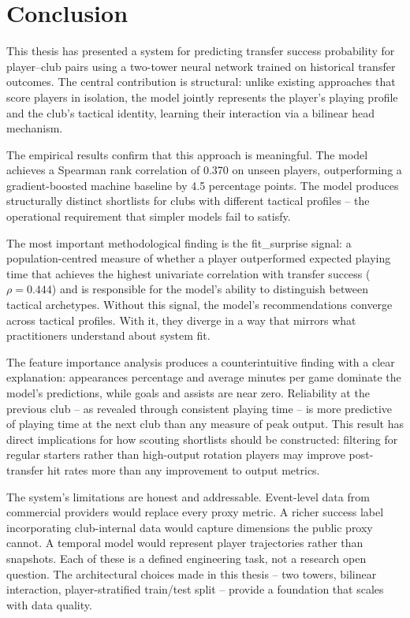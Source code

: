 \documentclass[12pt, a4paper, oneside]{report}
\begin{document}
\chapter{Conclusion}
\label{chap:conclusion}

This thesis has presented a system for predicting transfer success probability for player--club pairs using a two-tower neural network trained on historical transfer outcomes. The central contribution is structural: unlike existing approaches that score players in isolation, the model jointly represents the player's playing profile and the club's tactical identity, learning their interaction via a bilinear head mechanism.

The empirical results confirm that this approach is meaningful. The model achieves a Spearman rank correlation of 0.370 on unseen players, outperforming a gradient-boosted machine baseline by 4.5 percentage points. The model produces structurally distinct shortlists for clubs with different tactical profiles -- the operational requirement that simpler models fail to satisfy.

The most important methodological finding is the fit\_surprise signal: a population-centred measure of whether a player outperformed expected playing time that achieves the highest univariate correlation with transfer success ($\rho = 0.444$) and is responsible for the model's ability to distinguish between tactical archetypes. Without this signal, the model's recommendations converge across tactical profiles. With it, they diverge in a way that mirrors what practitioners understand about system fit.

The feature importance analysis produces a counterintuitive finding with a clear explanation: appearances percentage and average minutes per game dominate the model's predictions, while goals and assists are near zero. Reliability at the previous club -- as revealed through consistent playing time -- is more predictive of playing time at the next club than any measure of peak output. This result has direct implications for how scouting shortlists should be constructed: filtering for regular starters rather than high-output rotation players may improve post-transfer hit rates more than any improvement to output metrics.

The system's limitations are honest and addressable. Event-level data from commercial providers would replace every proxy metric. A richer success label incorporating club-internal data would capture dimensions the public proxy cannot. A temporal model would represent player trajectories rather than snapshots. Each of these is a defined engineering task, not a research open question. The architectural choices made in this thesis -- two towers, bilinear interaction, player-stratified train/test split -- provide a foundation that scales with data quality.
\end{document}
